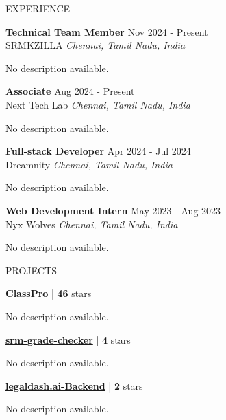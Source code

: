 \documentclass{resume}
\begin{document}

\begin{rSection}{EXPERIENCE}

\textbf{Technical Team Member} \hfill Nov 2024 - Present\\
SRMKZILLA \hfill \textit{Chennai, Tamil Nadu, India}

No description available.

\textbf{Associate} \hfill Aug 2024 - Present\\
Next Tech Lab \hfill \textit{Chennai, Tamil Nadu, India}

No description available.

\textbf{Full-stack Developer} \hfill Apr 2024 - Jul 2024\\
Dreamnity \hfill \textit{Chennai, Tamil Nadu, India}

No description available.

\textbf{Web Development Intern} \hfill May 2023 - Aug 2023\\
Nyx Wolves  \hfill \textit{Chennai, Tamil Nadu, India}

No description available.


\end{rSection}

\vspace{1.5em}


\begin{rSection}{PROJECTS}    
    \item \textbf{\href{https://github.com/Rahuletto/ClassPro}{ClassPro}} | \textbf{46} stars

No description available.
\begin{itemize}
\end{itemize}
\item \textbf{\href{https://github.com/root-daemon/srm-grade-checker}{srm-grade-checker}} | \textbf{4} stars

No description available.
\begin{itemize}
\end{itemize}
\item \textbf{\href{https://github.com/SachinPrasanth777/legaldash.ai-Backend}{legaldash.ai-Backend}} | \textbf{2} stars

No description available.
\begin{itemize}
\end{itemize}

\end{rSection}
\vspace{1.5em}
\end{document}
